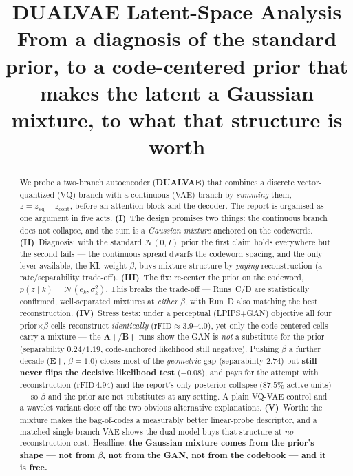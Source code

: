 \documentclass[11pt]{article}
\title{\textbf{DUALVAE Latent-Space Analysis}\\[2pt]
\large From a diagnosis of the standard prior, to a code-centered prior that\\
makes the latent a Gaussian mixture, to what that structure is worth}
\author{}
\date{}
\begin{document}
\maketitle
\vspace{-2.2em}

\begin{abstract}
\noindent
We probe a two-branch autoencoder (\textbf{DUALVAE}) that combines a discrete
vector-quantized (VQ) branch with a continuous (VAE) branch by \emph{summing} them,
$z = z_{\text{vq}} + z_{\text{cont}}$, before an attention block and the decoder. The report is
organised as one argument in five acts. \textbf{(I)}~The design promises two things: the
continuous branch does not collapse, and the sum is a \emph{Gaussian mixture} anchored on the
codewords. \textbf{(II)}~Diagnosis: with the standard $\mathcal{N}(0,I)$ prior the first claim
holds everywhere but the second fails --- the continuous spread dwarfs the codeword spacing, and
the only lever available, the KL weight $\beta$, buys mixture structure by \emph{paying}
reconstruction (a rate/separability trade-off). \textbf{(III)}~The fix: re-center the prior on the
codeword, $p(z\mid k)=\mathcal{N}(e_k,\sigma_k^2)$. This breaks the trade-off --- Runs~C/D are
statistically confirmed, well-separated mixtures at \emph{either} $\beta$, with Run~D also matching
the best reconstruction. \textbf{(IV)}~Stress tests: under a perceptual (LPIPS$+$GAN) objective all
four prior$\times\beta$ cells reconstruct \emph{identically} ($\text{rFID}\approx3.9$--$4.0$), yet
only the code-centered cells carry a mixture --- the \textbf{A+}/\textbf{B+} runs
show the GAN is \emph{not} a substitute for the prior (separability $0.24$/$1.19$, code-anchored
likelihood still negative). Pushing $\beta$ a further decade (\textbf{E+}, $\beta{=}1.0$) closes
most of the \emph{geometric} gap (separability $2.74$) but \textbf{still never flips the decisive
likelihood test} ($-0.08$), and pays for the attempt with reconstruction ($\text{rFID}\,4.94$) and
the report's only posterior collapse ($87.5\%$ active units) --- so $\beta$ and the prior are not
substitutes at any setting. A plain VQ-VAE control and a wavelet variant close off the two obvious
alternative explanations. \textbf{(V)}~Worth: the mixture makes the bag-of-codes a measurably better
linear-probe descriptor, and a matched single-branch VAE shows the dual model buys that structure at
\emph{no} reconstruction cost. Headline: \textbf{the Gaussian mixture comes from the prior's shape
--- not from $\beta$, not from the GAN, not from the codebook --- and it is free.}
\end{abstract}
\end{document}

